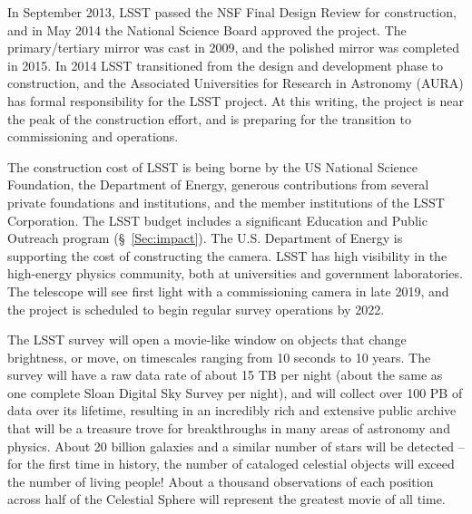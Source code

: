 In September 2013, LSST passed the NSF Final Design Review for construction,
and in May 2014 the National Science Board approved the project.
The primary/tertiary mirror was cast in 2009, and the polished mirror
was completed in 2015.
In 2014 LSST transitioned from the design and development phase to
construction, and the Associated Universities for Research in
Astronomy (AURA) has formal responsibility for the LSST project.  At
this writing,  the project is near the peak of the construction
effort, and is preparing for the transition to
commissioning and operations.

The construction cost of LSST is being borne by the US National Science
Foundation, the Department of Energy, generous contributions from several
private foundations and institutions, and the member institutions of the
LSST Corporation. The LSST budget includes a significant Education and
Public Outreach program (\S~\ref{Sec:impact}).
The U.S. Department of Energy is supporting the cost of constructing the
camera. LSST has high visibility in the high-energy physics community,
both at universities and government laboratories. The telescope will
see first light with a commissioning camera in late 2019, and the
project is scheduled to begin regular survey operations by 2022.

The LSST survey will open a movie-like window on objects that
change brightness, or move, on timescales ranging from 10 seconds to 10 years.
The survey will have a raw data rate of about 15 TB per night (about the same as one
complete Sloan Digital Sky Survey per night), and will collect over 100 PB
of data over its lifetime, resulting in an incredibly rich and extensive
public archive that will be a treasure trove for breakthroughs in many areas
of astronomy and physics. About 20 billion galaxies and a similar number of stars
will be detected -- for the first time in history, the number of cataloged
celestial objects will exceed the number of living people! About a thousand
observations of each position across half of the Celestial Sphere will
represent the greatest movie of all time.


